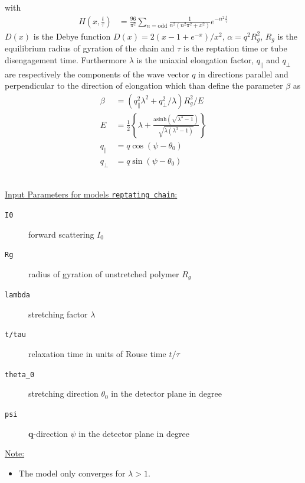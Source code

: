 with
\begin{align}
H\left(x,\frac{t}{\tau}\right) &= \frac{96}{\pi^2} \sum_{n = \mathrm{odd}} \frac{1}{n^2\left(n^2\pi^2+x^2\right)} e^{-n^2 \frac{t}{\tau}}
\end{align}
$D(x)$ is the Debye function $D(x) = 2\left(x - 1 + e^{-x}\right)/x^2$, $\alpha = q^2 R_g^2$, $R_g$ is the equilibrium radius of gyration
of the chain and $\tau$ is the reptation time or tube disengagement time.
Furthermore $\lambda$ is the uniaxial elongation factor, $q_\parallel$ and $q_\perp$ are respectively the components of the wave vector $q$ in directions parallel and
perpendicular to the direction of elongation which than define the parameter $\beta$ as
\begin{align}
\beta &= \left(q_\parallel^2\lambda^2+q_\perp^2/\lambda\right) R_g^2/E \\
E &= \frac{1}{2} \left\{\lambda +\frac{\mathrm{asinh}\left(\sqrt{\lambda^3-1}\right)}{\sqrt{\lambda\left(\lambda^3-1\right)}} \right\} \\
q_\parallel &= q \cos(\psi-\theta_0) \\
q_\perp &= q \sin(\psi-\theta_0)
\end{align}

\hspace{1pt}\\
\underline{Input Parameters for models \texttt{reptating chain}:}\\
\begin{description}
\item[\texttt{I0}] forward scattering $I_0$
\item[\texttt{Rg}] radius of gyration of unstretched polymer $R_g$
\item[\texttt{lambda}] stretching factor $\lambda$
\item[\texttt{t/tau}] relaxation time in units of Rouse time $t/\tau$
\item[\texttt{theta\_0}] stretching direction $\theta_0$ in the detector plane in degree
\item[\texttt{psi}] $\mathbf{q}$-direction $\psi$ in the detector plane in degree
\end{description}

\underline{Note:}
\begin{itemize}
\item The model only converges for $\lambda >1$.
\end{itemize}

